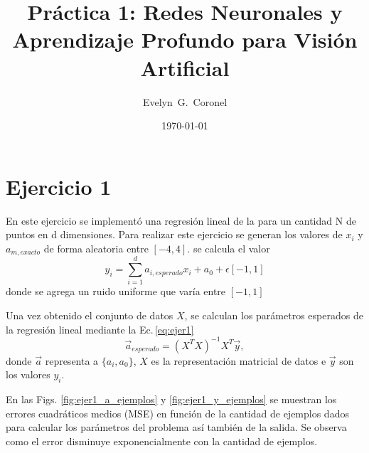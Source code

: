 


\title{Práctica 1: Redes Neuronales y Aprendizaje Profundo para Visión Artificial}
\author{Evelyn~G.~Coronel}


\date[]{\lowercase{\today}} %

\maketitle
\onecolumngrid


\section*{Ejercicio 1}

En este ejercicio se implementó una regresión lineal de la  para un cantidad N de puntos en d dimensiones.  Para realizar este ejercicio se generan los valores de $x_i$ y $a_{m,exacto}$ de forma aleatoria entre $[-4,4]$. se calcula el valor
\begin{equation}
  y_i= \sum_{i=1}^d a_{i,esperado}x_i+ a_0 + \epsilon[-1,1]  
\end{equation}
donde se agrega un ruido uniforme que varía entre $[-1,1]$

Una vez obtenido el conjunto de datos $X$, se calculan  los parámetros esperados de la regresión lineal mediante la Ec.\,\ref{eq:ejer1}
\begin{equation}
     \vec a_{esperado} = (X^TX)^{-1}X^T \vec y,
     \label{eq:ejer1}
 \end{equation} 
donde $\vec a$ representa a $\{a_i, a_0 \}$, $X$ es la representación matricial de datos e $\vec y$ son los valores $y_i$.

En las Figs.  \ref{fig:ejer1_a_ejemplos} y \ref{fig:ejer1_y_ejemplos}  se muestran los errores cuadráticos medios  (MSE) en función de la cantidad de ejemplos dados para calcular los parámetros del problema así también de la salida.  Se observa como el error disminuye exponencialmente con la cantidad de ejemplos.


